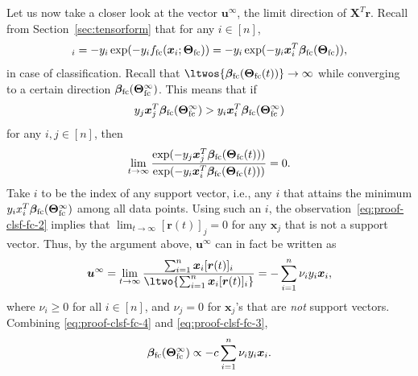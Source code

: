 \documentclass{article} %
\def\vr{{\bm{r}}}
\def\vu{{\bm{u}}}
\def\vx{{\bm{x}}}
\def\mX{{\bm{X}}}
\newcommand{\vbeta}{{\bm{\beta}}}
\newcommand{\vbetafc}{\vbeta_{\rm fc}}
\newcommand{\bTheta}{\bm{\Theta}}
\newcommand{\bThetafc}{\bTheta_{\rm fc}}
\newcommand{\ffc}{f_{\rm fc}}
\begin{document}
Let us now take a closer look at the vector $\vu^\infty$, the limit direction of $\mX^T \vr$.
Recall from Section~\ref{sec:tensorform} that for any $i \in [n]$,
\begin{equation*}
[\vr]_i = -y_i \exp(-y_i \ffc(\vx_i;\bThetafc)) = -y_i \exp(-y_i \vx_i^T \vbetafc(\bThetafc)),
\end{equation*} 
in case of classification. Recall that $\ltwos{\vbetafc(\bThetafc(t))} \to \infty$ while converging to a certain direction $\vbetafc(\bThetafc^\infty)$. This means that if 
\begin{equation*}
    y_j \vx_j^T \vbetafc(\bThetafc^\infty) > y_i\vx_i^T \vbetafc(\bThetafc^\infty)
\end{equation*}
for any $i,j \in [n]$, then
\begin{equation}
\label{eq:proof-clsf-fc-2}
    \lim_{t \to \infty} \frac{\exp(-y_j \vx_j^T \vbetafc(\bThetafc(t)))}{\exp(-y_i \vx_i^T \vbetafc(\bThetafc(t)))} = 0.
\end{equation}
Take $i$ to be the index of any support vector, i.e., any $i$ that attains the minimum $y_i x_i^T \vbetafc(\bThetafc^\infty)$ among all data points. Using such an $i$, the observation~\eqref{eq:proof-clsf-fc-2} implies that $\lim_{t \to\infty}[\vr(t)]_j = 0$ for any $\vx_j$ that is not a support vector.
Thus, by the argument above, $\vu^\infty$ can in fact be written as
\begin{equation}
\label{eq:proof-clsf-fc-4}
    \vu^\infty = \lim_{t \to \infty} \frac{\sum_{i=1}^n \vx_i [\vr(t)]_i}
    {\ltwo{\sum_{i=1}^n \vx_i [\vr(t)]_i}}
    = - \sum_{i=1}^n \nu_i y_i \vx_i,
\end{equation}
where $\nu_i \geq 0$ for all $i \in [n]$, and $\nu_j = 0$ for $\vx_j$'s that are \emph{not} support vectors.
Combining \eqref{eq:proof-clsf-fc-4} and \eqref{eq:proof-clsf-fc-3},
\begin{equation}
\label{eq:proof-clsf-fc-1}
    \vbetafc(\bThetafc^{\infty}) \propto -c \sum_{i = 1}^n \nu_i y_i \vx_i.
\end{equation}
\end{document}
